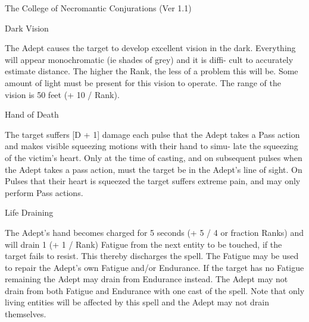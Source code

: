 \begin{Chapter}{The College of Necromantic Conjurations (Ver 1.1)}
\begin{spell}[S-5]{Dark Vision }
\begin{effects}
 The  Adept  causes  the  target  to  develop 
excellent vision in the dark. Everything will appear 
monochromatic  (ie  shades  of  grey)  and  it  is  diffi-
cult to accurately estimate distance. The higher the 
Rank,  the  less  of  a  problem  this  will  be.  Some 
amount  of  light  must  be  present  for  this  vision  to 
operate.  The  range  of  the  vision  is  50  feet  (+  10  / 
Rank). 

\end{effects}
\end{spell}

\begin{spell}[S-6]{Hand of Death }

\begin{effects}
 The  target  suffers  [D  +  1]  damage  each 
pulse that the Adept takes a Pass action and makes 
visible squeezing motions with their hand to simu-
late the squeezing of the victim’s heart. Only at the 
time of casting, and on subsequent pulses when the 
Adept takes a pass action, must the target be in the 
Adept’s  line  of  sight.  On  Pulses  that  their  heart  is 
squeezed  the  target  suffers  extreme  pain,  and may 
only perform Pass actions. 

\end{effects}
\end{spell}

\begin{spell}[S-7]{Life Draining }

\begin{effects}
 The  Adept’s  hand  becomes  charged  for  5 
seconds (+ 5 / 4 or fraction Ranks) and will drain 1 
(+  1  /  Rank)  Fatigue  from  the  next  entity  to  be 
touched,  if  the  target  fails  to  resist.  This  thereby 
discharges  the  spell.  The  Fatigue  may  be  used  to 
repair  the  Adept’s  own  Fatigue  and/or  Endurance. 
If  the  target  has  no  Fatigue  remaining  the  Adept 
may drain from Endurance instead. The Adept may 
not  drain  from  both  Fatigue  and  Endurance  with 
one cast of the spell. Note that only  living entities 
will be affected by this spell and the Adept may not 
drain themselves. 


\end{effects}
\end{spell}
\end{Chapter}
